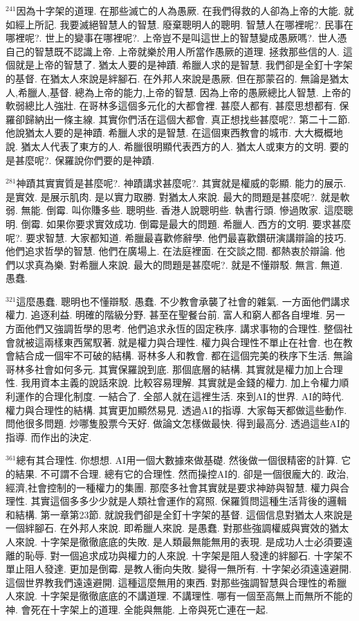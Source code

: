 \documentclass{book}
\begin{document}
$^{241}$因為十字架的道理.
在那些滅亡的人為愚厥.
在我們得救的人卻為上帝的大能.
就如經上所記.
我要滅絕智慧人的智慧.
廢棄聰明人的聰明.
智慧人在哪裡呢?.
民事在哪裡呢?.
世上的變事在哪裡呢?.
上帝豈不是叫這世上的智慧變成愚厥嗎?.
世人憑自己的智慧既不認識上帝.
上帝就樂於用人所當作愚厥的道理.
拯救那些信的人.
這個就是上帝的智慧了.
猶太人要的是神蹟.
希臘人求的是智慧.
我們卻是全釘十字架的基督.
在猶太人來說是絆腳石.
在外邦人來說是愚厥.
但在那蒙召的.
無論是猶太人,希臘人,基督.
總為上帝的能力,上帝的智慧.
因為上帝的愚厥總比人智慧.
上帝的軟弱總比人強壯.
在哥林多這個多元化的大都會裡.
甚麼人都有.
甚麼思想都有.
保羅卻歸納出一條主線.
其實你們活在這個大都會.
真正想找些甚麼呢?.
第二十二節.
他說猶太人要的是神蹟.
希臘人求的是智慧.
在這個東西教會的城市.
大大概概地說.
猶太人代表了東方的人.
希臘很明顯代表西方的人.
猶太人或東方的文明.
要的是甚麼呢?.
保羅說你們要的是神蹟.

$^{281}$神蹟其實實質是甚麼呢?.
神蹟講求甚麼呢?.
其實就是權威的彰顯.
能力的展示.
是實效.
是展示肌肉.
是以實力取勝.
對猶太人來說.
最大的問題是甚麼呢?.
就是軟弱.
無能.
倒霉.
叫你賺多些.
聰明些.
香港人說聰明些.
執書行頭.
慘過敗家.
這麼聰明.
倒霉.
如果你要求實效成功.
倒霉是最大的問題.
希臘人.
西方的文明.
要求甚麼呢?.
要求智慧.
大家都知道.
希臘最喜歡修辭學.
他們最喜歡鑽研演講辯論的技巧.
他們追求哲學的智慧.
他們在廣場上.
在法庭裡面.
在交談之間.
都熱衷於辯論.
他們以求真為樂.
對希臘人來說.
最大的問題是甚麼呢?.
就是不懂辯駁.
無言.
無道.
愚蠢.

$^{321}$這麼愚蠢.
聰明也不懂辯駁.
愚蠢.
不少教會承襲了社會的雜氣.
一方面他們講求權力.
追逐利益.
明確的階級分野.
甚至在聖餐台前.
富人和窮人都各自埋堆.
另一方面他們又強調哲學的思考.
他們追求永恆的固定秩序.
講求事物的合理性.
整個社會就被這兩樣東西駕馭著.
就是權力與合理性.
權力與合理性不單止在社會.
也在教會結合成一個牢不可破的結構.
哥林多人和教會.
都在這個完美的秩序下生活.
無論哥林多社會如何多元.
其實保羅說到底.
那個底層的結構.
其實就是權力加上合理性.
我用資本主義的說話來說.
比較容易理解.
其實就是金錢的權力.
加上令權力順利運作的合理化制度.
一結合了.
全部人就在這裡生活.
來到AI的世界.
AI的時代.
權力與合理性的結構.
其實更加顯然易見.
透過AI的指導.
大家每天都做這些動作.
問他很多問題.
炒哪隻股票今天好.
做論文怎樣做最快.
得到最高分.
透過這些AI的指導.
而作出的決定.

$^{361}$總有其合理性.
你想想.
AI用一個大數據來做基礎.
然後做一個很精密的計算.
它的結果.
不可謂不合理.
總有它的合理性.
然而操控AI的.
卻是一個很龐大的.
政治,經濟,社會控制的一種權力的集團.
那麼多社會其實就是要求神跡與智慧.
權力與合理性.
其實這個多多少少就是人類社會運作的寫照.
保羅質問這種生活背後的邏輯和結構.
第一章第23節.
就說我們卻是全釘十字架的基督.
這個信息對猶太人來說是一個絆腳石.
在外邦人來說.
即希臘人來說.
是愚蠢.
對那些強調權威與實效的猶太人來說.
十字架是徹徹底底的失敗.
是人類最無能無用的表現.
是成功人士必須要遠離的恥辱.
對一個追求成功與權力的人來說.
十字架是阻人發達的絆腳石.
十字架不單止阻人發達.
更加是倒霉.
是教人衝向失敗.
變得一無所有.
十字架必須遠遠避開.
這個世界教我們遠遠避開.
這種這麼無用的東西.
對那些強調智慧與合理性的希臘人來說.
十字架是徹徹底底的不講道理.
不講理性.
哪有一個至高無上而無所不能的神.
會死在十字架上的道理.
全能與無能.
上帝與死亡連在一起.
\end{document}
